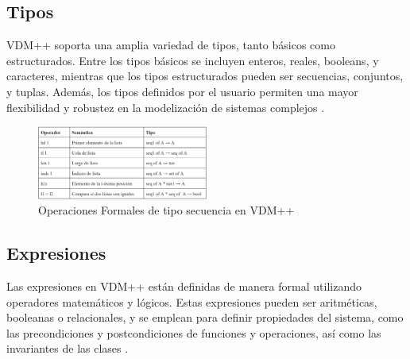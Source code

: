 \subsection{Tipos}
VDM++ soporta una amplia variedad de tipos, tanto básicos como estructurados. Entre los tipos básicos se incluyen enteros, reales, booleans, y caracteres, mientras que los tipos estructurados pueden ser secuencias, conjuntos, y tuplas. Además, los tipos definidos por el usuario permiten una mayor flexibilidad y robustez en la modelización de sistemas complejos \cite{woodcock1996}.

\begin{figure}[h]
    \centering
    \includegraphics[width=0.5\textwidth]{Recursos/tipos_variables_vdmpp.png}
    \caption{Operaciones Formales de tipo secuencia en VDM++}
\end{figure}

\subsection{Expresiones}
Las expresiones en VDM++ están definidas de manera formal utilizando operadores matemáticos y lógicos. Estas expresiones pueden ser aritméticas, booleanas o relacionales, y se emplean para definir propiedades del sistema, como las precondiciones y postcondiciones de funciones y operaciones, así como las invariantes de las clases \cite{fitzgerald2009}.



